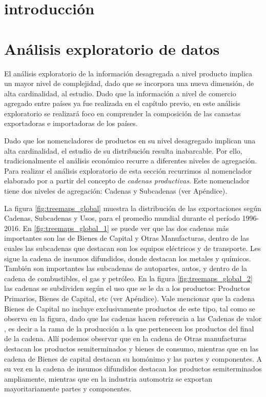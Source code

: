 \documentclass[class=article, crop=false]{standalone}
\begin{document}
	
	
	
	
	
	
	\section{introducción}
	
	
	\section{Análisis exploratorio de datos}
	
	El análisis exploratorio de la información desagregada a nivel producto implica un mayor nivel de complejidad, dado que se incorpora una nueva dimensión, de alta cardinalidad, al estudio. Dado que la información a nivel de comercio agregado entre países ya fue realizada en el capítulo previo, en este análisis exploratorio se realizará foco en comprender la composición de las canastas exportadoras e importadoras de los países.
	
	Dado que los nomencladores de productos en su nivel desagregado implican una alta cardinalidad, el estudio de su distribución resulta inabarcable. Por ello, tradicionalmente el análisis económico recurre a diferentes niveles de agregación. Para realizar el análisis exploratorio de esta sección recurrimos al nomenclador elaborado por  \cite{molinari2016especializacion} a partir del concepto de \textit{cadenas productivas}. Este nomenclador tiene dos niveles de agregación: Cadenas y Subcadenas (ver Apéndice).
	
		
	La figura \ref{fig:treemaps_global} muestra la distribución de las exportaciones según Cadenas, Subcadenas y Usos, para el promedio mundial durante el período 1996-2016. En \ref{fig:treemaps_global_1} se puede ver que las dos cadenas más importantes son las de Bienes de Capital y Otras Manufacturas, dentro de las cuales las subcadenas que destacan son los equipos eléctricos y de transporte. 	Les sigue la cadena de insumos difundidos, donde destacan los metales y químicos. También son importantes las subcadenas de autopartes, autos, y dentro de la cadena de combustibles, el gas y petróleo. En la figura \ref{fig:treemaps_global_2} las cadenas se subdividen según el uso que se le da a los productos: Productos Primarios, Bienes de Capital, etc (ver Apéndice). Vale mencionar que la cadena Bienes de Capital no incluye exclusivamente productos de este tipo, tal como se observa en la figura, dado que las cadenas hacen referencia a las Cadenas de valor \citep{humphrey2000governance}, es decir a la rama de la producción a la que pertenecen los productos del final de la cadena. Allí podemos observar que en la cadena de Otras manufacturas destacan los productos semiterminados y bienes de consumo, mientras que en las cadena de Bienes de capital destacan su homónimo y las partes y componentes. A su vez en la cadena de insumos difundidos destacan los productos semiterminados ampliamente, mientras que en la industria automotriz se exportan mayoritariamente partes y componentes. 
	
\end{document}
